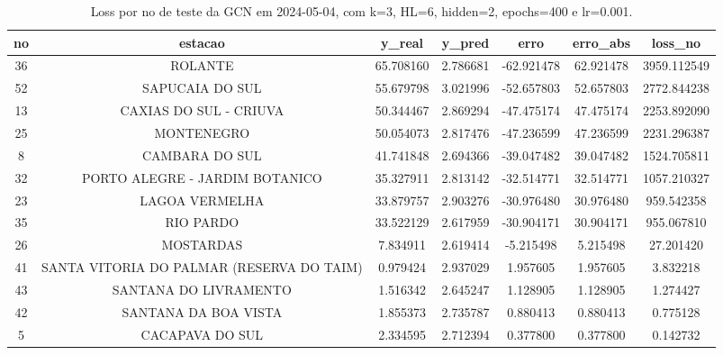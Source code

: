 \begin{table}[h]
\centering
\caption{Loss por no de teste da GCN em 2024-05-04, com k=3, HL=6, hidden=2, epochs=400 e lr=0.001.}
\label{tab:gcn_loss_k3_hl6_h2_e400_d20240504}
\begin{tabular}{ccccccc}
\toprule
no & estacao & y\_real & y\_pred & erro & erro\_abs & loss\_no \\
\midrule
36 & ROLANTE & 65.708160 & 2.786681 & -62.921478 & 62.921478 & 3959.112549 \\
52 & SAPUCAIA DO SUL & 55.679798 & 3.021996 & -52.657803 & 52.657803 & 2772.844238 \\
13 & CAXIAS DO SUL - CRIUVA & 50.344467 & 2.869294 & -47.475174 & 47.475174 & 2253.892090 \\
25 & MONTENEGRO & 50.054073 & 2.817476 & -47.236599 & 47.236599 & 2231.296387 \\
8 & CAMBARA DO SUL & 41.741848 & 2.694366 & -39.047482 & 39.047482 & 1524.705811 \\
32 & PORTO ALEGRE - JARDIM BOTANICO & 35.327911 & 2.813142 & -32.514771 & 32.514771 & 1057.210327 \\
23 & LAGOA VERMELHA & 33.879757 & 2.903276 & -30.976480 & 30.976480 & 959.542358 \\
35 & RIO PARDO & 33.522129 & 2.617959 & -30.904171 & 30.904171 & 955.067810 \\
26 & MOSTARDAS & 7.834911 & 2.619414 & -5.215498 & 5.215498 & 27.201420 \\
41 & SANTA VITORIA DO PALMAR (RESERVA DO TAIM) & 0.979424 & 2.937029 & 1.957605 & 1.957605 & 3.832218 \\
43 & SANTANA DO LIVRAMENTO & 1.516342 & 2.645247 & 1.128905 & 1.128905 & 1.274427 \\
42 & SANTANA DA BOA VISTA & 1.855373 & 2.735787 & 0.880413 & 0.880413 & 0.775128 \\
5 & CACAPAVA DO SUL & 2.334595 & 2.712394 & 0.377800 & 0.377800 & 0.142732 \\
\bottomrule
\end{tabular}
\end{table}
